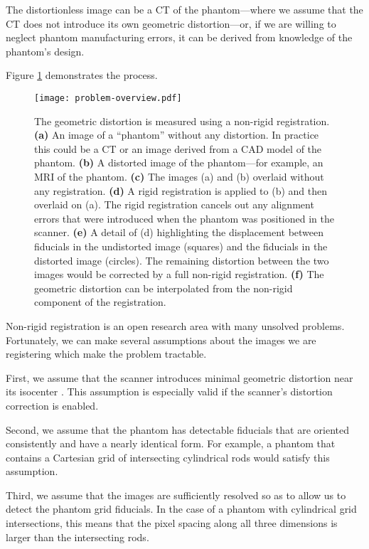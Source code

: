 \documentclass[12pt]{article}
\begin{document}
The distortionless image can be a CT of the phantom---where we assume that the CT does not introduce its own geometric distortion---or, if we are willing to neglect phantom manufacturing errors, it can be derived from knowledge of the phantom's design.

Figure \ref{fig:problem-overview} demonstrates the process.

\begin{figure}[h]
    \centering
    \texttt{[image: problem-overview.pdf]}
    \caption{The geometric distortion is measured using a non-rigid registration. \textbf{(a)} An image of a ``phantom'' without any distortion.  In practice this could be a CT or an image derived from a CAD model of the phantom.  \textbf{(b)} A distorted image of the phantom---for example, an MRI of the phantom.  \textbf{(c)} The images (a) and (b) overlaid without any registration.  \textbf{(d)} A rigid registration is applied to (b) and then overlaid on (a).  The rigid registration cancels out any alignment errors that were introduced when the phantom was positioned in the scanner. \textbf{(e)} A detail of (d) highlighting the displacement between fiducials in the undistorted image (squares) and the fiducials in the distorted image (circles).  The remaining distortion between the two images would be corrected by a full non-rigid registration. \textbf{(f)} The geometric distortion can be interpolated from the non-rigid component of the registration.}
    \label{fig:problem-overview}
\end{figure}

Non-rigid registration is an open research area with many unsolved problems.  Fortunately, we can make several assumptions about the images we are registering which make the problem tractable.

First, we assume that the scanner introduces minimal geometric distortion near its isocenter \cite{baldwin2007}.  This assumption is especially valid if the scanner's distortion correction is enabled.

Second, we assume that the phantom has detectable fiducials that are oriented consistently and have a nearly identical form.  For example, a phantom that contains a Cartesian grid of intersecting cylindrical rods would satisfy this assumption.

Third, we assume that the images are sufficiently resolved so as to allow us to detect the phantom grid fiducials.  In the case of a phantom with cylindrical grid intersections, this means that the pixel spacing along all three dimensions is larger than the intersecting rods.
\end{document}
